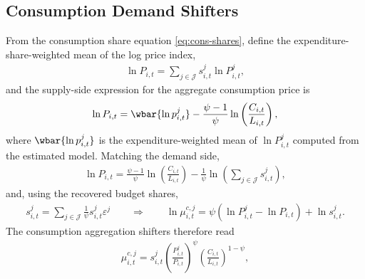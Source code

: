 \documentclass[10pt]{article}
\begin{document}
\subsection*{Consumption Demand Shifters}
From the consumption share equation \eqref{eq:cons-shares}, define the
expenditure-share-weighted mean of the log price index,
\begin{align}
  \ln P_{i,t} = \sum_{j \in \mathcal{J}} s^j_{i,t} \ln P^j_{i,t}, \label{eq:mc-exp}
\end{align}
and the supply-side expression for the aggregate consumption price is
\begin{align}
  \ln P_{i,t} = \wbar{\ln p^j_{i,t}} - \frac{\psi - 1}{\psi} \ln
  \left( \frac{C_{i,t}}{L_{i,t}} \right), \label{eq:consexp-supply}
\end{align}
where $\wbar{\ln p^j_{i,t}}$ is the expenditure-weighted mean of $\ln P^j_{i,t}$
computed from the estimated model. Matching the demand side,
\begin{align}
  \ln P_{i,t} = \frac{\psi - 1}{\psi} \ln \left( \frac{C_{i,t}}{L_{i,t}} \right)
  - \frac{1}{\psi} \ln \left( \sum_{j \in \mathcal{J}} s^j_{i,t} \right),
  \label{eq:consexp-demand1}
\end{align}
and, using the recovered budget shares,
\begin{align}
  s^j_{i,t} = \sum_{j \in \mathcal{J}} \frac{1}{\psi} s^j_{i,t} \varepsilon^j
  \qquad\Longrightarrow\qquad
  \ln \mu^{c,j}_{i,t} = \psi \left( \ln P^j_{i,t} - \ln P_{i,t} \right)
  + \ln s^j_{i,t}. \label{eq:consexp-demand2}
\end{align}
The consumption aggregation shifters therefore read
\begin{align}
  \mu^{c,j}_{i,t} = s^j_{i,t} \left( \frac{P^j_{i,t}}{P_{i,t}} \right)^{\psi}
  \left( \frac{C_{i,t}}{L_{i,t}} \right)^{1 - \psi}, \label{eq:mu-tradables}
\end{align}

\end{document}
